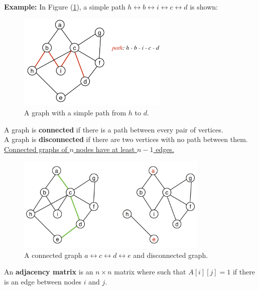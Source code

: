 \noindent
\textbf{Example:} In Figure (\ref{fig:path_graph}), a simple path $h\leftrightarrow b \leftrightarrow i \leftrightarrow c \leftrightarrow d$ is shown:\\
\begin{figure}[h]
    \begin{center}
      \includegraphics[height=1.8in]{./Sections/graphs/path_graph.png}
    \end{center}
     \caption{A graph with a simple path from $h$ to $d$.}\label{fig:path_graph}
  \end{figure}

\begin{Def}[Connectivity]

    A graph is \textbf{connected} if there is a path between every pair of vertices.\\
    A graph is \textbf{disconnected} if there are two vertices with no path between them.\\
    \underline{Connected graphs of $n$ nodes have at least $n-1$ edges.}
\end{Def}
\begin{figure}[h]
    \begin{center}
      \includegraphics[height=1.8in]{./Sections/graphs/con_graph.png}
    \end{center}
     \caption{A connected graph $a\leftrightarrow c \leftrightarrow d \leftrightarrow e$  and disconnected graph.}\label{fig:con_graph}
  \end{figure}

  \newpage
  \begin{Def}
      
      An \textbf{adjacency matrix} is an $n\times n$ matrix where such that $A[i][j] = 1$ if there is an edge between nodes $i$ and $j$.

  \end{Def}

